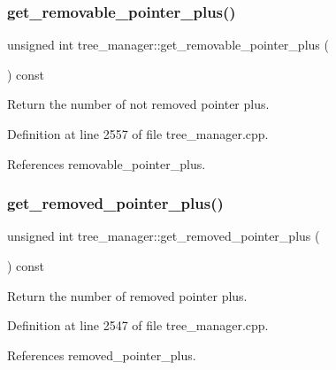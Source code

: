 \subsubsection{\texorpdfstring{get\+\_\+removable\+\_\+pointer\+\_\+plus()}{get\_removable\_pointer\_plus()}}
{\footnotesize\ttfamily unsigned int tree\+\_\+manager\+::get\+\_\+removable\+\_\+pointer\+\_\+plus (\begin{DoxyParamCaption}{ }\end{DoxyParamCaption}) const}



Return the number of not removed pointer plus. 



Definition at line 2557 of file tree\+\_\+manager.\+cpp.



References removable\+\_\+pointer\+\_\+plus.

\mbox{\label{classtree__manager_a3872777bd3609bf9bfdcbdb7bc2ea7ca}} 
\subsubsection{\texorpdfstring{get\+\_\+removed\+\_\+pointer\+\_\+plus()}{get\_removed\_pointer\_plus()}}
{\footnotesize\ttfamily unsigned int tree\+\_\+manager\+::get\+\_\+removed\+\_\+pointer\+\_\+plus (\begin{DoxyParamCaption}{ }\end{DoxyParamCaption}) const}



Return the number of removed pointer plus. 



Definition at line 2547 of file tree\+\_\+manager.\+cpp.



References removed\+\_\+pointer\+\_\+plus.

\mbox{\label{classtree__manager_aabae1e5f92b152ef3e8d8134b8cbf955}} 
